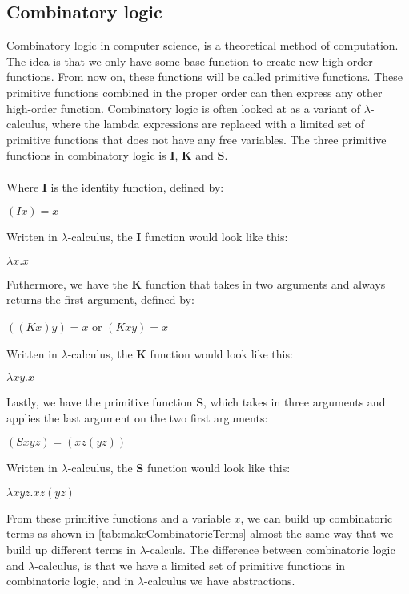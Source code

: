 \subsection{Combinatory logic}
\label{combinatory logic}
Combinatory logic in computer science, is a theoretical method of computation. The idea is that we only have some base function to create new high-order functions. From now on, these functions will be called primitive functions. These primitive functions combined in the proper order can then express any other high-order function. Combinatory logic is often looked at as a variant of $\lambda$-calculus, where the lambda expressions are replaced with a limited set of primitive functions that does not have any free variables. 
The three primitive functions in combinatory logic is \textbf{I}, \textbf{K} and \textbf{S}.
\\ \\
Where \textbf{I} is the identity function, defined by: \\ 
\begin{center}
    $(I x) = x$\\    
\end{center}
Written in $\lambda$-calculus, the \textbf{I} function would look like this:\\
\begin{center}
    $\lambda x.x$\\    
\end{center}
Futhermore, we have the \textbf{K} function that takes in two arguments and always returns the first argument, defined by:
\begin{center}
    $ ((K x) y) = x$ or $(K x y) = x$\\    
\end{center}
Written in $\lambda$-calculus, the \textbf{K} function would look like this:\\
\begin{center}
    $\lambda xy.x$\\    
\end{center}
Lastly, we have the primitive function \textbf{S}, which takes in three arguments and applies the last argument on the two first arguments:
\begin{center}
    $ (S x y z) = (x z (y z))$\\    
\end{center}
Written in $\lambda$-calculus, the \textbf{S} function would look like this:\\
\begin{center}
    $\lambda xyz.xz(yz)$\\    
\end{center}
From these primitive functions and a variable $x$, we can build up combinatoric terms as shown in \autoref{tab:makeCombinatoricTerms} almost the same way that we build up different terms in $\lambda$-calculs. The difference between combinatoric logic and $\lambda$-calculus, is that we have a limited set of primitive functions in combinatoric logic, and in $\lambda$-calculus we have abstractions.

